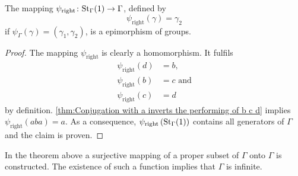 \begin{thm}\label{thm:Gamma is infinite}
The mapping $\psi_\mathrm{right}\colon\St[\Gamma]{1}\to\Gamma$, defined by
\begin{equation*}
\psi_\mathrm{right}(\gamma)=\gamma_2
\end{equation*}
if $\psi_\Gamma(\gamma)=(\gamma_1,\gamma_2)$, is a epimorphism of groups.
\end{thm}
\begin{proof}
The mapping $\psi_\mathrm{right}$ is clearly a homomorphism. It fulfils
\begin{align*}
\psi_\mathrm{right}(d)&=b,\\
\psi_\mathrm{right}(b)&=c \text{ and}\\
\psi_\mathrm{right}(c)&=d
\end{align*}
by definition. \cref{thm:Conjugation with a inverts the performing of b c d} implies $\psi_\mathrm{right}(aba)=a$. As a consequence, $\psi_\mathrm{right}\left(\St[\Gamma]{1}\right)$ contains all generators of $\Gamma$ and the claim is proven. 
\end{proof}

In the theorem above a surjective mapping of a proper subset of $\Gamma$ onto $\Gamma$ is constructed. The existence of such a function implies that $\Gamma$ is infinite.

